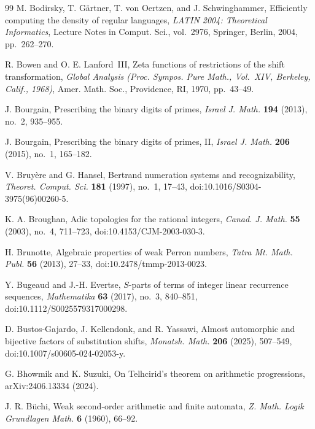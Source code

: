 \begin{thebibliography}{99}
M. Bodirsky, T. G\"artner, T. von Oertzen, and J. Schwinghammer,
Efficiently computing the density of regular languages,
\textit{LATIN 2004: Theoretical Informatics}, Lecture Notes in Comput.
Sci., vol.~2976, Springer, Berlin, 2004, pp.~262--270.

R. Bowen and O. E. Lanford~III,
Zeta functions of restrictions of the shift transformation,
\textit{Global Analysis (Proc. Sympos. Pure Math., Vol.~XIV, Berkeley,
Calif., 1968)}, Amer. Math. Soc., Providence, RI, 1970, pp.~43--49.

J. Bourgain,
Prescribing the binary digits of primes,
\textit{Israel J. Math.} \textbf{194} (2013), no.~2, 935--955.

J. Bourgain,
Prescribing the binary digits of primes, II,
\textit{Israel J. Math.} \textbf{206} (2015), no.~1, 165--182.

V. Bruy{\`e}re and G. Hansel,
Bertrand numeration systems and recognizability,
\textit{Theoret. Comput. Sci.} \textbf{181} (1997), no.~1, 17--43,
doi:10.1016/S0304-3975(96)00260-5.

K. A. Broughan,
Adic topologies for the rational integers,
\textit{Canad. J. Math.} \textbf{55} (2003), no.~4, 711--723,
doi:10.4153/CJM-2003-030-3.

H. Brunotte,
Algebraic properties of weak Perron numbers,
\textit{Tatra Mt. Math. Publ.} \textbf{56} (2013), 27--33,
doi:10.2478/tmmp-2013-0023.

Y. Bugeaud and J.-H. Evertse,
\(S\)-parts of terms of integer linear recurrence sequences,
\textit{Mathematika} \textbf{63} (2017), no.~3, 840--851,
doi:10.1112/S0025579317000298.

D. Bustos-Gajardo, J. Kellendonk, and R. Yassawi,
Almost automorphic and bijective factors of substitution shifts,
\textit{Monatsh. Math.} \textbf{206} (2025), 507--549,
doi:10.1007/s00605-024-02053-y.

G. Bhowmik and K. Suzuki,
On Telhcirid's theorem on arithmetic progressions,
arXiv:2406.13334 (2024).

J. R. B{\"u}chi,
Weak second-order arithmetic and finite automata,
\textit{Z. Math. Logik Grundlagen Math.} \textbf{6} (1960), 66--92.


\end{thebibliography}
